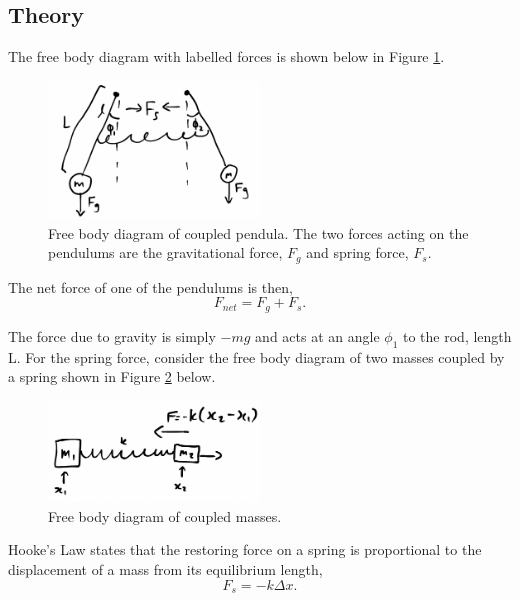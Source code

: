 \documentclass{article}
\begin{document}
\subsection{Theory} \label{eqn:derivation}
The free body diagram with labelled forces is shown below in 
Figure \ref{fig:coupledpendula}.

\begin{figure} [H]
    \centering
    \includegraphics[width=0.5\textwidth]{coupledpendula.png}
    \caption{Free body diagram of coupled pendula. The two
    forces acting on the pendulums are the gravitational force, 
    $F_g$ and spring force, $F_s$.}
    \label{fig:coupledpendula}
\end{figure}

The net force of one of the pendulums is then,
\begin{equation} \label{eqn:netforce}
    F_{net} = F_g + F_s.
\end{equation}

The force due to gravity is simply $-mg$ and acts at an angle
$\phi_1$ to the rod, length L. For the spring force, consider
the free body diagram of two masses coupled by a spring shown
in Figure \ref{fig:twomass} below.

\begin{figure} [H]
    \centering
    \includegraphics[width=0.5\textwidth]{twomass.png}
    \caption{Free body diagram of coupled masses.}
    \label{fig:twomass}
\end{figure}

Hooke's Law states that the restoring force on a spring is 
proportional to the displacement of a mass from its 
equilibrium length,
\begin{equation}
    F_s = -k\Delta x.
\end{equation}
\end{document}
